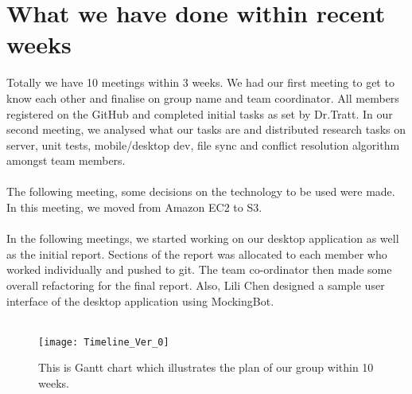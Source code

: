 \section{What we have done within recent weeks}

Totally we have 10 meetings within 3 weeks. We had our first meeting to get to know each other and finalise on group name and team coordinator. All members registered on the GitHub and completed initial tasks as set by Dr.Tratt. In our second meeting, we analysed what our tasks are and distributed research tasks on server, unit tests, mobile/desktop dev, file sync and conflict resolution algorithm amongst team members. \\\\
The following meeting, some decisions on the technology to be used were made. In this meeting, we moved from Amazon EC2 to S3. \\\\
In the following meetings, we started working on our desktop application as well as the initial report. Sections of the report was allocated to each member who worked individually and pushed to git. The team co-ordinator then made some overall refactoring for the final report. Also, Lili Chen designed a sample user interface of the desktop application using MockingBot. \\\


\begin{sidewaysfigure}
\centering
\texttt{[image: Timeline\_Ver\_0]}
\caption{This is Gantt chart which illustrates the plan of our group within 10 weeks.}
\end{sidewaysfigure}\newpage
